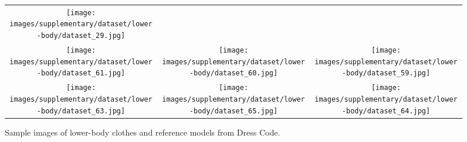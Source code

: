 \begin{figure*}[t]
{\begin{tabular}{ccc}
\texttt{[image: images/supplementary/dataset/lower-body/dataset\_29.jpg]} \\
\addlinespace[0.05cm]
\texttt{[image: images/supplementary/dataset/lower-body/dataset\_61.jpg]} &
\texttt{[image: images/supplementary/dataset/lower-body/dataset\_60.jpg]} &
\texttt{[image: images/supplementary/dataset/lower-body/dataset\_59.jpg]} \\
\addlinespace[0.05cm]
\texttt{[image: images/supplementary/dataset/lower-body/dataset\_63.jpg]} &
\texttt{[image: images/supplementary/dataset/lower-body/dataset\_65.jpg]} &
\texttt{[image: images/supplementary/dataset/lower-body/dataset\_64.jpg]} \\
\end{tabular}
}
\caption{Sample images of lower-body clothes and reference models from Dress Code.}
\label{fig:dataset_lowerbody}
\end{figure*}



